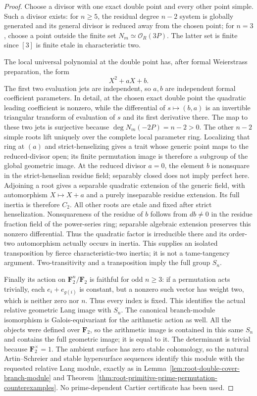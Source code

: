 \begin{proof}
Choose a divisor with one exact double point and every other
point simple. Such a divisor exists: for \(n\ge5\), the
residual degree \(n-2\) system is globally generated and its
general divisor is reduced away from the chosen point; for
\(n=3\), choose a point outside the finite set
\(N_m\simeq\mathcal O_R(3P)\). The latter set is finite since
\([3]\) is finite etale in characteristic two.

The local universal polynomial at the double point has, after
formal Weierstrass preparation, the form
\[
                       X^2+aX+b.
\]
The first two evaluation jets are independent, so \(a,b\)
are independent formal coefficient parameters. In detail, at
the chosen exact double point the quadratic leading coefficient
is nonzero, while the differential of \(s\mapsto(b,a)\)
is an invertible triangular transform of evaluation of \(s\)
and its first derivative there. The map to these two jets is
surjective because \(\deg N_m(-2P)=n-2>0\).
The other \(n-2\) simple roots lift uniquely over the complete
local parameter ring. Localizing that ring at \((a)\) and
strict-henselizing gives a trait whose generic point maps to the
reduced-divisor open; its finite permutation image is therefore
a subgroup of the global geometric image. At the reduced
divisor \(a=0\), the element \(b\) is nonsquare in the
strict-henselian residue field; separably closed does not imply
perfect here. Adjoining a root gives a separable quadratic
extension of the generic field, with automorphism
\(X\mapsto X+a\) and a purely inseparable residue extension.
Its full inertia is therefore \(C_2\). All other roots are
etale and fixed after strict henselization. Nonsquareness of
the residue of \(b\) follows from \(db\ne0\) in the
residue fraction field of the power-series ring; separable
algebraic extension preserves this nonzero differential. Thus
the quadratic factor is irreducible there and its order-two
automorphism actually occurs in inertia. This supplies an
isolated transposition by fierce characteristic-two inertia;
it is not a tame-tangency argument. Two-transitivity and a
transposition imply the full group \(S_n\).

Finally its action on \(\mathbf F_2^n/\mathbf F_2\) is faithful
for odd \(n\ge3\): if a permutation acts trivially, each
\(e_i+e_{g(i)}\) is constant, but a nonzero such vector has
weight two, which is neither zero nor \(n\). Thus every index
is fixed. This identifies the actual relative geometric
Lang image with \(S_n\). The canonical branch-module
isomorphism is Galois-equivariant for the arithmetic action as
well. All the objects were defined over \(\mathbf F_2\),
so the arithmetic image is contained in this same \(S_n\)
and contains the full geometric image; it is equal to it.
The determinant is trivial because \(\mathbf F_2^\times=1\).
The ambient surface has zero stable cohomology, so the natural
Artin--Schreier and stable hypersurface sequences identify this
module with the requested relative Lang module, exactly as in
Lemma~\ref{lem:root-double-cover-branch-module} and
Theorem~\ref{thm:root-primitive-prime-permutation-counterexamples}.
No prime-dependent Cartier certificate has been used.



\end{proof}
